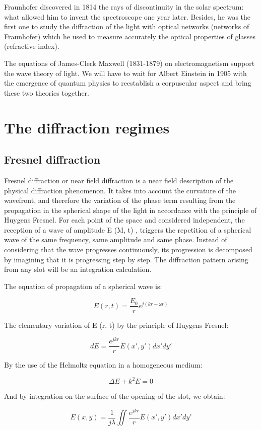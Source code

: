 \documentclass[10pt,a4paper]{article}
\begin{document}
Fraunhofer discovered in 1814 the rays of discontinuity in the solar spectrum: what allowed him to invent the spectroscope one year later. Besides, he was the first one to study the diffraction of the light with optical networks (networks of Fraunhofer) which he used to measure accurately the optical properties of glasses (refractive index). 

The equations of James-Clerk Maxwell (1831-1879) on electromagnetism support the wave theory of light. We will have to wait for Albert Einstein in 1905 with the emergence of quantum physics to reestablish a corpuscular aspect and bring these two theories together.

\section{The diffraction regimes}
	\subsection{Fresnel diffraction}
Fresnel diffraction or near field diffraction is a near field description of the physical diffraction phenomenon. It takes into account the curvature of the wavefront, and therefore the variation of the phase term resulting from the propagation in the spherical shape of the light in accordance with the principle of Huygens Fresnel. For each point of the space and considered independent, the reception of a wave of amplitude E (M, t) , triggers the repetition of a spherical wave of the same frequency, same amplitude and same phase. Instead of considering that the wave progresses continuously, its progression is decomposed by imagining that it is progressing step by step. The diffraction pattern arising from any slot will be an integration calculation. 

The equation of propagation of a spherical wave is:

\[E(r,t)= \frac{E_0}{r} e^{j(kr-\omega t)}\]

The elementary variation of E (r, t) by the principle of Huygens Fresnel:

\[dE=\frac{e^{jkr}}{r} E(x',y') dx' dy'\]

By the use of the Helmoltz equation in a homogeneous medium: 

\[\Delta E+k^2 E=0\]

And by integration on the surface of the opening of the slot, we obtain:

\[E(x,y)=\frac{1}{j\lambda} \iint \frac{e^{jkr}}{r}E(x',y')dx'dy'\]
\end{document}
